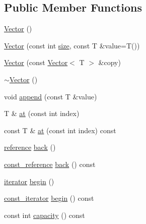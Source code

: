 \subsection*{Public Member Functions}
\begin{DoxyCompactItemize}
\item 
\hyperlink{classprism_1_1containers_1_1_vector_aa2af3bb48d3a7cd783dff0270307a45e}{Vector} ()
\item 
\hyperlink{classprism_1_1containers_1_1_vector_a8fd8f2944888a71c1e6e9ae0bbf890a2}{Vector} (const int \hyperlink{classprism_1_1containers_1_1_vector_afca7821bc43be621b12e55f89f7f518a}{size}, const T \&value=T())
\item 
\hyperlink{classprism_1_1containers_1_1_vector_aa3e11fefca796cb11588eb32bb6a89c5}{Vector} (const \hyperlink{classprism_1_1containers_1_1_vector}{Vector}$<$ T $>$ \&copy)
\item 
\hyperlink{classprism_1_1containers_1_1_vector_a58e4ef79be6d926803af6a47c61e4b30}{$\sim$\+Vector} ()
\item 
void \hyperlink{classprism_1_1containers_1_1_vector_a924f518701e9c8ac5bf5e72684c7d544}{append} (const T \&value)
\item 
T \& \hyperlink{classprism_1_1containers_1_1_vector_ab6604abf1fa5021c44fa4da3fe6e916f}{at} (const int index)
\item 
const T \& \hyperlink{classprism_1_1containers_1_1_vector_a2046a7661e670f12309ad6e988c9169e}{at} (const int index) const 
\item 
\hyperlink{classprism_1_1containers_1_1_vector_a557fd3cca76315ccd4112d8b7398e43c}{reference} \hyperlink{classprism_1_1containers_1_1_vector_aad61ba2bc825e9a5b98c00279884faf5}{back} ()
\item 
\hyperlink{classprism_1_1containers_1_1_vector_a9950012c32498b47e38c98f2ce9fe048}{const\+\_\+reference} \hyperlink{classprism_1_1containers_1_1_vector_aec8c8e8c4dba5430d65ce2b050fa43ea}{back} () const 
\item 
\hyperlink{classprism_1_1containers_1_1_vector_a00f2237bf0922d6299f1004c0a717fd5}{iterator} \hyperlink{classprism_1_1containers_1_1_vector_a8a146dbfe2c2d67e9a33383e59b8ace0}{begin} ()
\item 
\hyperlink{classprism_1_1containers_1_1_vector_ab972cb3df6df07d9806f8750a948ec9d}{const\+\_\+iterator} \hyperlink{classprism_1_1containers_1_1_vector_a4310ee10517b621aaec41ac83cc66bb8}{begin} () const 
\item 
const int \hyperlink{classprism_1_1containers_1_1_vector_a905b16131b216695f71172206215c8f3}{capacity} () const 

\end{DoxyCompactItemize}
